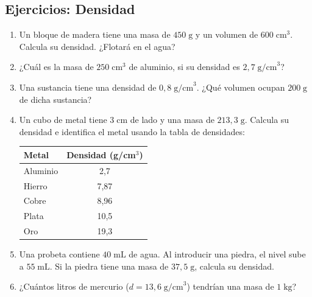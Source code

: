 \documentclass[12pt, letterpaper]{article}
\begin{document}
\subsection{Ejercicios: Densidad}

\begin{enumerate}[leftmargin=*, resume]
  \item \facil{} Un bloque de madera tiene una masa de $450\;\text{g}$ y un volumen de $600\;\text{cm}^3$. Calcula su densidad. ¿Flotará en el agua?

  \item \facil{} ¿Cuál es la masa de $250\;\text{cm}^3$ de aluminio, si su densidad es $2{,}7\;\text{g/cm}^3$?

  \item \facil{} Una sustancia tiene una densidad de $0{,}8\;\text{g/cm}^3$. ¿Qué volumen ocupan $200\;\text{g}$ de dicha sustancia?

  \item \facil{} Un cubo de metal tiene $3\;\text{cm}$ de lado y una masa de $213{,}3\;\text{g}$. Calcula su densidad e identifica el metal usando la tabla de densidades:
        \begin{center}
          \small
          \begin{tabular}{lc}
            \toprule
            \textbf{Metal} & \textbf{Densidad (g/cm$^3$)} \\
            \midrule
            Aluminio       & 2,7                          \\
            Hierro         & 7,87                         \\
            Cobre          & 8,96                         \\
            Plata          & 10,5                         \\
            Oro            & 19,3                         \\
            \bottomrule
          \end{tabular}
        \end{center}

  \item \medio{} Una probeta contiene $40\;\text{mL}$ de agua. Al introducir una piedra, el nivel sube a $55\;\text{mL}$. Si la piedra tiene una masa de $37{,}5\;\text{g}$, calcula su densidad.

  \item \medio{} ¿Cuántos litros de mercurio ($d = 13{,}6\;\text{g/cm}^3$) tendrían una masa de $1\;\text{kg}$?


\end{enumerate}
\end{document}
